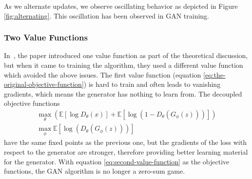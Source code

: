 As we alternate updates, we observe oscillating behavior as depicted
in Figure \ref{fig:alternating}.  This oscillation has been observed
in GAN training.

%
%
%

\subsubsection{Two Value Functions}%
\label{sec:two-value}

In~\cite{ref:goodfellow-original}, the paper introduced one value
function as part of the theoretical discussion, but when it came to
training the algorithm, they used a different value function which
avoided the above issues. The first value function (equation
\ref{eq:the-original-objective-function}) is hard to train and often
leads to vanishing gradients, which means the generator has nothing to
learn from. The decoupled objective functions
\begin{align}
  \label{eq:second-value-function} \max_{\theta} \left(
  \mathbb{E}\left[\log{D_\theta(x)}\right] +
  \mathbb{E}\left[\log(1 - D_\theta(G_\phi(z)))\right]
  \right) \\
  \max_{\phi}\mathbb{E}\left[\log(D_\theta(G_\phi(z)))\right]
\end{align} have the same fixed points as the previous one, but the
gradients of the loss with respect to the generator are stronger,
therefore providing better learning material for the generator. With
equation \ref{eq:second-value-function} as the objective functions,
the GAN algorithm is no longer a zero-sum game.

